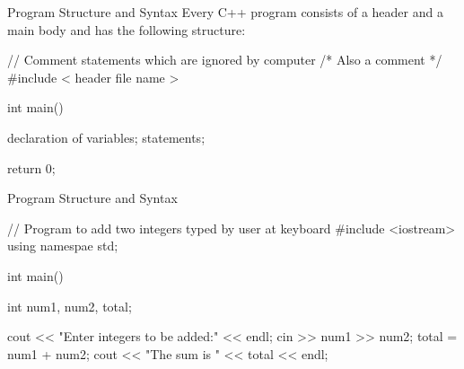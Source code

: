 \documentclass[../lecture1-introduction.tex]{subfiles}
\begin{document}
\begin{frame}[fragile]{Program Structure and Syntax}
    Every C++ program consists of a header and a main body and has the following
    structure:
\begin{cppcode}
// Comment statements which are ignored by computer
/* Also a comment */
#include < header file name >

int main()
{
    declaration of variables;
    statements;

    return 0;
}
\end{cppcode}
\end{frame}

\begin{frame}[fragile]{Program Structure and Syntax}
\begin{cppcode}
// Program to add two integers typed by user at keyboard
#include <iostream>
using namespae std;

int main()
{
    int num1, num2, total;
    
    cout << "Enter integers to be added:" << endl;
    cin >> num1 >> num2;
    total = num1 + num2;
    cout << "The sum is " << total << endl;
    
}
\end{cppcode}
\end{frame}
\end{document}
